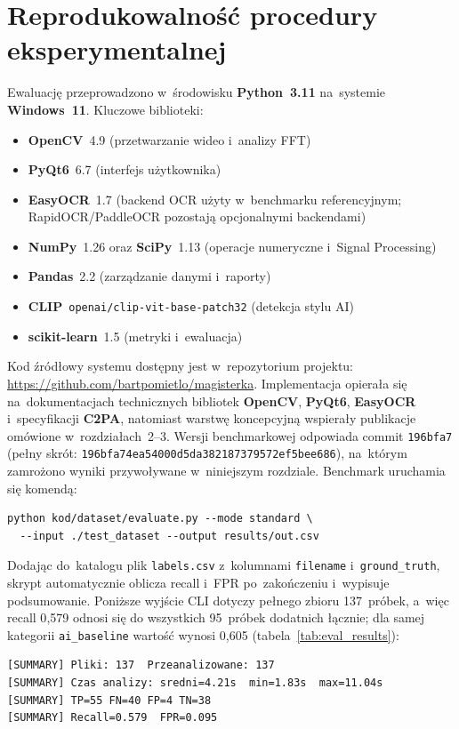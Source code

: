 \section{Reprodukowalność procedury eksperymentalnej}
\label{sec:reprodukowalnosc}

Ewaluację przeprowadzono w~środowisku \textbf{Python~3.11} na~systemie \textbf{Windows~11}.
Kluczowe biblioteki:
\begin{itemize}
  \item \textbf{OpenCV}~4.9 (przetwarzanie wideo i~analizy FFT)
  \item \textbf{PyQt6}~6.7 (interfejs użytkownika)
  \item \textbf{EasyOCR}~1.7 (backend OCR użyty w~benchmarku referencyjnym; RapidOCR/PaddleOCR pozostają opcjonalnymi backendami)
  \item \textbf{NumPy}~1.26 oraz \textbf{SciPy}~1.13 (operacje numeryczne i~Signal Processing)
  \item \textbf{Pandas}~2.2 (zarządzanie danymi i~raporty)
  \item \textbf{CLIP}~\texttt{openai/clip-vit-base-patch32} (detekcja stylu AI)
  \item \textbf{scikit-learn}~1.5 (metryki i~ewaluacja)
\end{itemize}

Kod źródłowy systemu dostępny jest w~repozytorium projektu:
\url{https://github.com/bartpomietlo/magisterka}.
Implementacja opierała się na~dokumentacjach technicznych bibliotek
\textbf{OpenCV}, \textbf{PyQt6}, \textbf{EasyOCR} i~specyfikacji
\textbf{C2PA}, natomiast warstwę koncepcyjną wspierały publikacje
omówione w~rozdziałach~2--3.
Wersji benchmarkowej odpowiada commit \texttt{196bfa7}
(pełny skrót: \texttt{196bfa74ea54000d5da382187379572ef5bee686}),
na~którym zamrożono wyniki przywoływane w~niniejszym rozdziale.
Benchmark uruchamia się komendą:
\begin{verbatim}
python kod/dataset/evaluate.py --mode standard \
  --input ./test_dataset --output results/out.csv
\end{verbatim}

Dodając do~katalogu plik \texttt{labels.csv} z~kolumnami
\texttt{filename} i~\texttt{ground\_truth}, skrypt automatycznie
oblicza recall i~FPR po~zakończeniu i~wypisuje podsumowanie. Poniższe wyjście CLI
dotyczy pełnego zbioru 137~próbek, a~więc recall 0{,}579 odnosi się do wszystkich
95~próbek dodatnich łącznie; dla samej kategorii \texttt{ai\_baseline}
wartość wynosi 0{,}605 (tabela~\ref{tab:eval_results}):
\begin{verbatim}
[SUMMARY] Pliki: 137  Przeanalizowane: 137
[SUMMARY] Czas analizy: sredni=4.21s  min=1.83s  max=11.04s
[SUMMARY] TP=55 FN=40 FP=4 TN=38
[SUMMARY] Recall=0.579  FPR=0.095
\end{verbatim}

